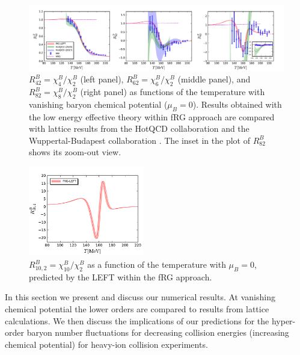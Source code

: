 \documentclass[%
reprint,
superscriptaddress,
showpacs,preprintnumbers,
amsmath,amssymb,
aps,
prd,
]{revtex4-1}
\begin{document}
	\begin{figure}[t]
		\includegraphics[width=1\textwidth]{R42R62R82-T-muB0}
		\caption{$R^{B}_{42}=\chi^{B}_{4}/\chi^{B}_{2}$ (left panel), $R^{B}_{62}=\chi^{B}_{6}/\chi^{B}_{2}$ (middle panel), and $R^{B}_{82}=\chi^{B}_{8}/\chi^{B}_{2}$ (right panel) as functions of the temperature with vanishing baryon chemical potential ($\mu_B=0$). Results obtained with the low energy effective theory within fRG approach are compared with lattice results from the HotQCD collaboration \cite{Bazavov:2017dus,Bazavov:2017tot,Bazavov:2020bjn} and the Wuppertal-Budapest collaboration \cite{Borsanyi:2018grb}. The inset in the plot of $R^{B}_{82}$ shows its zoom-out view.}\label{fig:R42R62R82-T-muB0}
	\end{figure}
	
	\begin{figure}[t]
		\includegraphics[width=0.45\textwidth]{R102-T-muB0}
		\caption{$R^{B}_{10,2}=\chi^{B}_{10}/\chi^{B}_{2}$ as a function of the temperature with $\mu_B=0$, predicted by the LEFT within the fRG approach.}\label{fig:R102-T-muB0}
	\end{figure}
	
	
	
	In this section we present and discuss our numerical results. At vanishing chemical potential the lower orders are compared to results from lattice calculations. We then discuss the implications of our predictions for the hyper-order baryon number fluctuations for decreasing collision energies (increasing chemical potential)  for heavy-ion collision experiments. 
	
\end{document}

